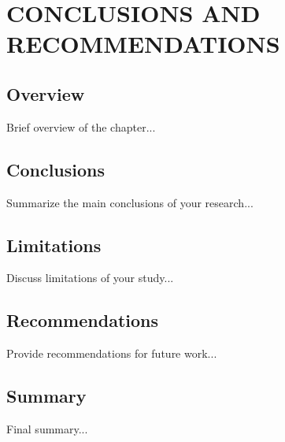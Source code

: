 
\chapter{CONCLUSIONS AND RECOMMENDATIONS}

\ifpdf
    \graphicspath{{5/figures/PNG}{5/figures/PDF}{5/figures}}
\else
    \graphicspath{{5/figures/EPS}{5/figures}}
\fi

\section{Overview}
Brief overview of the chapter...

\section{Conclusions}
Summarize the main conclusions of your research...

\section{Limitations}
Discuss limitations of your study...

\section{Recommendations}
Provide recommendations for future work...

\section{Summary}
Final summary...
